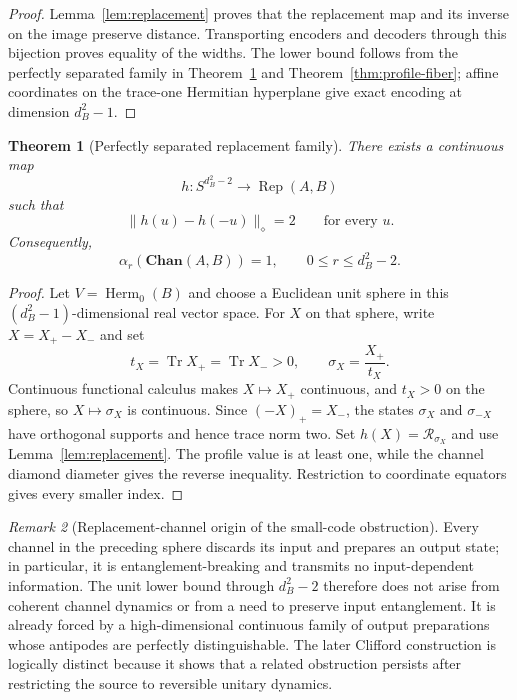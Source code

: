 \documentclass[11pt,a4paper]{article}
\theoremstyle{definition}
\theoremstyle{plain}
\newtheorem{theorem}{Theorem}[section]
\theoremstyle{remark}
\newtheorem{remark}[theorem]{Remark}
\DeclareMathOperator{\Tr}{Tr}
\DeclareMathOperator{\Herm}{Herm}
\newcommand{\Chan}{\mathbf{Chan}}
\begin{document}
\begin{proof}
Lemma~\ref{lem:replacement} proves that the replacement map and its inverse
on the image preserve distance. Transporting encoders and decoders through
this bijection proves equality of the widths. The lower bound follows from
the perfectly separated family in Theorem~\ref{thm:full-state-antipodal} and
Theorem~\ref{thm:profile-fiber}; affine coordinates on the trace-one
Hermitian hyperplane give exact encoding at dimension $d_B^2-1$.
\end{proof}

\begin{theorem}[Perfectly separated replacement family]
\label{thm:full-state-antipodal}
There exists a continuous map
\[
h:S^{d_B^2-2}\to\operatorname{Rep}(A,B)
\]
such that
\[
\|h(u)-h(-u)\|_\diamond=2
\qquad\text{for every }u.
\]
Consequently,
\[
\alpha_r(\Chan(A,B))=1,
\qquad0\leq r\leq d_B^2-2.
\]
\end{theorem}

\begin{proof}
Let $V=\Herm_0(B)$ and choose a Euclidean unit sphere in this
$(d_B^2-1)$-dimensional real vector space. For $X$ on that sphere, write
$X=X_+-X_-$ and set
\[
t_X=\Tr X_+=\Tr X_->0,
\qquad
\sigma_X=\frac{X_+}{t_X}.
\]
Continuous functional calculus makes $X\mapsto X_+$ continuous, and
$t_X>0$ on the sphere, so $X\mapsto\sigma_X$ is continuous. Since
$(-X)_+=X_-$, the states $\sigma_X$ and $\sigma_{-X}$ have orthogonal
supports and hence trace norm two. Set
$h(X)=\mathcal R_{\sigma_X}$ and use Lemma~\ref{lem:replacement}. The
profile value is at least one, while the channel diamond diameter gives the
reverse inequality. Restriction to coordinate equators gives every smaller
index.
\end{proof}

\begin{remark}[Replacement-channel origin of the small-code obstruction]
Every channel in the preceding sphere discards its input and prepares an
output state; in particular, it is entanglement-breaking and transmits no
input-dependent information. The unit lower bound through
$d_B^2-2$ therefore does not arise from coherent channel dynamics or from a
need to preserve input entanglement. It is already forced by a
high-dimensional continuous family of output preparations whose antipodes
are perfectly distinguishable. The later Clifford construction is
logically distinct because it shows that a
related obstruction persists after restricting the source to reversible
unitary dynamics.
\end{remark}
\end{document}
